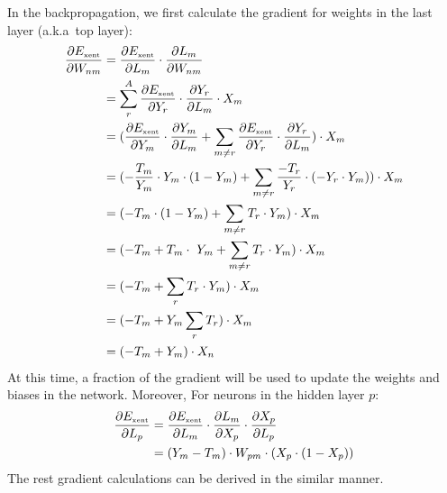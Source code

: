In the backpropagation, we first calculate the
gradient for weights in the last layer (a.k.a\ top layer):
\begin{align}
    \frac{\partial E_{\mbox{\tiny xent}}}{\partial W_{nm}} &= \frac{\partial E_{\mbox{\tiny xent}}}{\partial L_m} \cdot \frac{\partial L_m}{\partial W_{nm}}\\
    &= \sum_{r}^{A} \frac{\partial E_{\mbox{\tiny xent}}}{\partial Y_r} \cdot \frac{\partial Y_r}{\partial L_m} \cdot X_m\\
    &= (\frac{\partial E_{\mbox{\tiny xent}}}
            {\partial Y_m} 
        \cdot 
        \frac{\partial Y_m}
        {\partial L_m} 
        + 
        \sum_{m\neq r}
        \frac{\partial E_{\mbox{\tiny xent}}}
        {\partial Y_r} 
        \cdot 
        \frac{\partial Y_r}{\partial L_m} )\cdot X_m\\
    &= (- \frac{T_m}{Y_m} \cdot Y_m \cdot (1-Y_m) + \sum_{m\neq r}\frac{-T_r}{Y_r}\cdot(-Y_r\cdot Y_m)) \cdot X_m\\
    &= (-T_m\cdot(1-Y_m) + \sum_{m\neq r} T_r\cdot Y_m) \cdot X_m\\
    &= (-T_m + T_m\cdot\ Y_m + \sum_{m\neq r} T_r\cdot Y_m) \cdot X_m\\
    &= (-T_m + \sum_r T_r\cdot Y_m) \cdot X_m\\
    &= (-T_m + Y_m \sum_r T_r) \cdot X_m\\
    &= (-T_m + Y_m) \cdot X_n
\end{align}
At this time, a fraction of the gradient will be used 
to update the weights and biases
in the network.
Moreover, For neurons in the hidden layer \(p\):
\begin{align}
    \frac{\partial E_{\mbox{\tiny xent}}}{\partial L_p} &= \frac{\partial E_{\mbox{\tiny xent}}}{\partial L_m} \cdot \frac{\partial L_m}{\partial X_p} \cdot \frac{\partial X_p}{\partial L_p}\\
    &= (Y_m - T_m)\cdot W_{pm} \cdot (X_p\cdot(1-X_p))
\end{align}
The rest gradient calculations can be derived in the similar manner.

